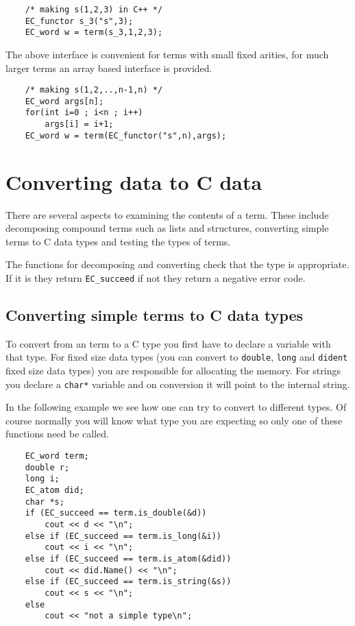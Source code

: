 \begin{verbatim}
    /* making s(1,2,3) in C++ */
    EC_functor s_3("s",3);
    EC_word w = term(s_3,1,2,3);
\end{verbatim}

The above interface is convenient for terms with small fixed arities,
for much larger terms an array based interface is provided.

\begin{verbatim}
    /* making s(1,2,..,n-1,n) */
    EC_word args[n];
    for(int i=0 ; i<n ; i++)
        args[i] = i+1;
    EC_word w = term(EC_functor("s",n),args);
\end{verbatim}


\section{Converting {\eclipse} data to C data}

There are several aspects to examining the contents of a term. These
include decomposing compound terms such as lists and structures,
converting simple terms to C data types and testing the types of terms.

The functions for decomposing and converting check that the type
is appropriate. If it is they return \verb.EC_succeed. if not
they return a negative error code.

\subsection{Converting simple {\eclipse} terms to C data types}

To convert from an {\eclipse} term to a C type you first have to
declare a variable with that type. For fixed size data types
(you can convert to \verb.double., \verb.long. and \verb.dident.
fixed size data types) you are responsible for allocating the
memory. For strings you declare a \verb.char*. variable and
on conversion it will point to the internal {\eclipse} string.

In the following example we see how one can try to convert to
different types. Of course normally you will know what type
you are expecting so only one of these functions need be called.
\begin{verbatim}
    EC_word term;
    double r;
    long i;
    EC_atom did;
    char *s;
    if (EC_succeed == term.is_double(&d))
        cout << d << "\n";
    else if (EC_succeed == term.is_long(&i))
        cout << i << "\n";
    else if (EC_succeed == term.is_atom(&did))
        cout << did.Name() << "\n";
    else if (EC_succeed == term.is_string(&s))
        cout << s << "\n";
    else
        cout << "not a simple type\n";
\end{verbatim}


